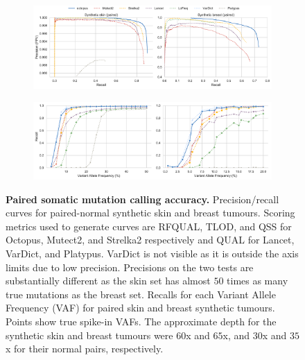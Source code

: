 \documentclass[notitlepage, twocolumn]{article}
\begin{document}
\begin{figure}[ht!]
    \centering
\captionsetup[subfigure]{position=top,labelfont=bf,textfont=normalfont,singlelinecheck=off,justification=raggedright}
    \begin{subfigure}[b]{\textwidth}
        \vspace{-0.5cm}
        \caption{}
        \includegraphics[width=\textwidth]{figures/somatic_precision_recall}
        \label{fig:somatic_pr}
    \end{subfigure}
    \begin{subfigure}[b]{\textwidth}
        \vspace{-1.0cm}
        \caption{}
        \includegraphics[width=\textwidth]{figures/somatic_vaf_recall}
        \label{fig:somatic_vaf_recall}
    \end{subfigure}
    \vspace{-1.0cm}
    \caption{\textbf{Paired somatic mutation calling accuracy.} \protect{} Precision/recall curves for paired-normal synthetic skin and breast tumours. Scoring metrics used to generate curves are RFQUAL, TLOD, and QSS for Octopus, Mutect2, and Strelka2 respectively and QUAL for Lancet, VarDict, and Platypus. VarDict is not visible as it is outside the axis limits due to low precision. Precisions on the two tests are substantially different as the skin set has almost $50$ times as many true mutations as the breast set. \protect{} Recalls for each Variant Allele Frequency (VAF) for paired skin and breast synthetic tumours. Points show true spike-in VAFs. The approximate depth for the synthetic skin and breast tumours were $60$x and $65$x, and $30$x and $35$x for their normal pairs, respectively.}
    \label{fig:syntumour}
\end{figure}
\end{document}
